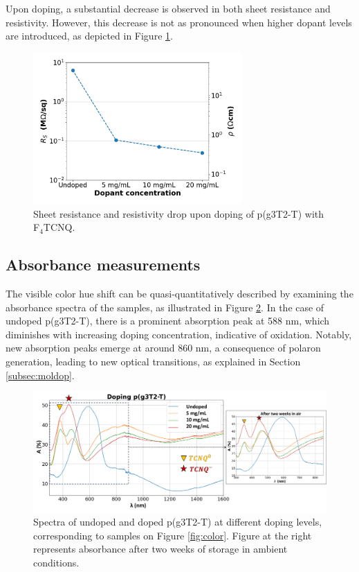 Upon doping, a substantial decrease is observed in both sheet resistance and resistivity. However, this decrease is not as pronounced when higher dopant levels are introduced, as depicted in Figure \ref{fig:rho}. %

\begin{figure}[ht]
  \centering
  \includegraphics[width=8cm]{Images/pdf/resist.pdf}
  \caption[Sheet resistance and resistivity drop upon doping]{Sheet resistance and resistivity drop upon doping of p(g3T2-T) with F$_{4}$TCNQ. %
  }
  \label{fig:rho}
\end{figure}

\subsection{Absorbance measurements}
The visible color hue shift can be quasi-quantitatively described by examining the absorbance spectra of the samples, as illustrated in Figure \ref{fig:abs}. In the case of undoped p(g3T2-T), there is a prominent absorption peak at 588 nm, which diminishes with increasing doping concentration, indicative of oxidation. Notably, new absorption peaks emerge at around 860 nm, a consequence of polaron generation, leading to new optical transitions, as explained in Section \ref{subsec:moldop}. 

\begin{figure}[ht]
  \centering
  \includegraphics[width=\textwidth]{Images/pdf/abs_v2.pdf}  
  \caption[Absorbance spectra of different doping levels of p(g3T2-T)]{Spectra of undoped and doped p(g3T2-T) at different doping levels, corresponding to samples on Figure \ref{fig:color}. Figure at the right represents absorbance after two weeks of storage in ambient conditions.}
  \label{fig:abs}
\end{figure}

